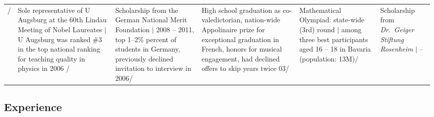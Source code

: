 \begin{longtable}[t]{R{\widthC} p{\widthB}}
/
& Sole representative of U Augsburg at the 60th Lindau Meeting of Nobel Laureates
{\footnotesize$\vert$ U Augsburg was ranked \#3 in the top national ranking for teaching quality in physics in 2006}  /
& Scholarship from the German National Merit Foundation {\footnotesize$\vert$ 2008 -- 2011, top 1--2\% percent of students in Germany, previously declined invitation to interview in 2006}/
&
High school graduation as co-valedictorian, nation-wide Appolinaire prize for exceptional graduation in French, honors for musical engagement, had declined offers to skip years twice\newline
03/
& Mathematical Olympiad: state-wide (3rd) round {\footnotesize$\vert$ among three best participants aged 16 -- 18 in Bavaria (population: 13M)}/
& Scholarship from \textit{Dr.~Geiger Stiftung Rosenheim} {\footnotesize$\vert$  -- } 
\end{longtable}

\newpage

\subsection*{Experience }
\vspace{.0em}


